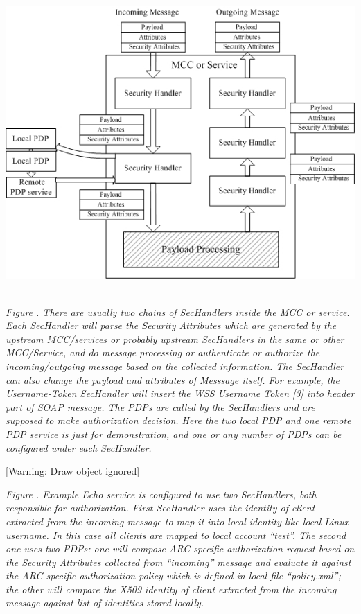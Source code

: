 \documentclass{article}
\newcounter{Figure}
\renewcommand\theFigure{\arabic{Figure}}
\begin{document}
\bigskip


\includegraphics[width=5.7709in,height=4.5209in]{SecurityFrameworkofARC1-img2.jpg}


{\itshape\color{black}
Figure \stepcounter{Figure}{\theFigure}. There are usually two chains of
SecHandlers inside the MCC or service. Each SecHandler will parse the
Security Attributes which are generated by the upstream MCC/services or
probably upstream SecHandlers in the same or other MCC/Service, and do
message processing or authenticate or authorize the incoming/outgoing
message based on the collected information. The SecHandler can also
change the payload and attributes of Messsage itself. For example, the
Username-Token SecHandler will insert the WSS Username Token [3] into
header part of SOAP message. The PDPs are called by the SecHandlers and
are supposed to make authorization decision. Here the two local PDP and
one remote PDP service is just for demonstration, and one or any number
of PDPs can be configured under each SecHandler.}


\bigskip

[Warning: Draw object ignored]

{\centering{}\itshape\color{black}
Figure \stepcounter{Figure}{\theFigure}. Example Echo service is
configured to use two SecHandlers, both responsible for authorization.
First SecHandler uses the identity of client extracted from the
incoming message to map it into local identity like local Linux
username. In this case all clients are mapped to local account
{\textquotedblleft}test{\textquotedblright}. The second one uses two
PDPs: one will compose ARC specific authorization request based on the
Security Attributes collected from
{\textquotedblleft}incoming{\textquotedblright} message and evaluate it
against the ARC specific authorization policy which is defined in local
file {\textquotedblleft}policy.xml{\textquotedblright}; the other will
compare the X509 identity of client extracted from the incoming message
against list of identities stored locally.
\par}
\end{document}
